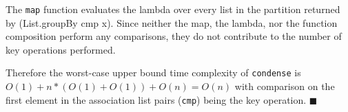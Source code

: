 \documentclass[../main.tex]{subfiles}
\begin{document}
The \texttt{map} function evaluates the lambda over every list in the partition returned by (List.groupBy cmp x).  Since
neither the map, the lambda, nor the function composition perform any comparisons, they do not contribute to the number
of key operations performed.

Therefore the worst-case upper bound time complexity of \texttt{condense} is $O(1) + n*(O(1) + O(1)) + O(n) = O(n)$ with comparison on the first element in
the association list pairs (\texttt{cmp}) being the key operation.
$\blacksquare$

\end{document}
